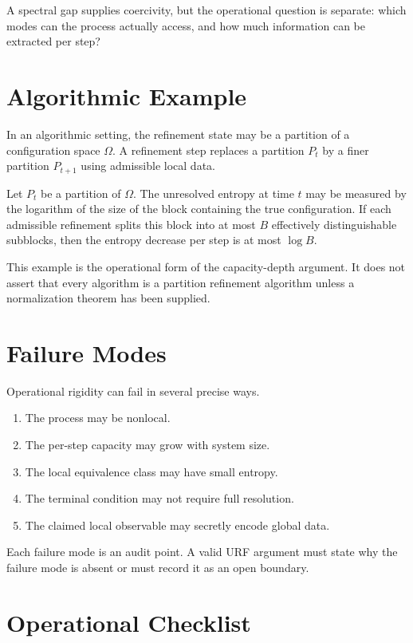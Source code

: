 A spectral gap supplies coercivity, but the operational question is separate:
which modes can the process actually access, and how much information can be
extracted per step?

\section{Algorithmic Example}

In an algorithmic setting, the refinement state may be a partition of a
configuration space \(\Omega\). A refinement step replaces a partition \(P_t\)
by a finer partition \(P_{t+1}\) using admissible local data.

\begin{example}
Let \(P_t\) be a partition of \(\Omega\). The unresolved entropy at time \(t\)
may be measured by the logarithm of the size of the block containing the true
configuration. If each admissible refinement splits this block into at most
\(B\) effectively distinguishable subblocks, then the entropy decrease per
step is at most \(\log B\).
\end{example}

This example is the operational form of the capacity-depth argument. It does
not assert that every algorithm is a partition refinement algorithm unless a
normalization theorem has been supplied.

\section{Failure Modes}

Operational rigidity can fail in several precise ways.

\begin{enumerate}
\item The process may be nonlocal.
\item The per-step capacity may grow with system size.
\item The local equivalence class may have small entropy.
\item The terminal condition may not require full resolution.
\item The claimed local observable may secretly encode global data.
\end{enumerate}

Each failure mode is an audit point. A valid URF argument must state why the
failure mode is absent or must record it as an open boundary.

\section{Operational Checklist}

